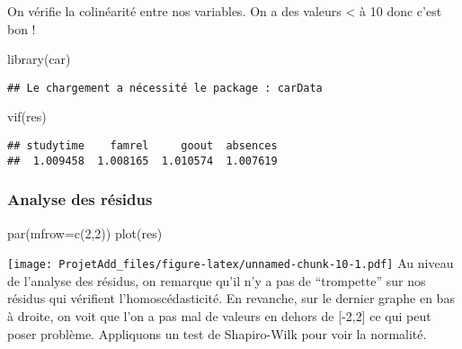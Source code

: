 \documentclass[
]{article}
\newenvironment{Shaded}{\begin{snugshade}}{\end{snugshade}}
\newcommand{\AttributeTok}[1]{\textcolor[rgb]{0.77,0.63,0.00}{#1}}
\newcommand{\DecValTok}[1]{\textcolor[rgb]{0.00,0.00,0.81}{#1}}
\newcommand{\FunctionTok}[1]{\textcolor[rgb]{0.00,0.00,0.00}{#1}}
\newcommand{\NormalTok}[1]{#1}
\newcommand{\SpecialCharTok}[1]{\textcolor[rgb]{0.00,0.00,0.00}{#1}}
\begin{document}
On vérifie la colinéarité entre nos variables. On a des valeurs
\textless{} à 10 donc c'est bon !

\begin{Shaded}
\begin{Highlighting}[]
\FunctionTok{library}\NormalTok{(car)}
\end{Highlighting}
\end{Shaded}

\begin{verbatim}
## Le chargement a nécessité le package : carData
\end{verbatim}

\begin{Shaded}
\begin{Highlighting}[]
\FunctionTok{vif}\NormalTok{(res) }
\end{Highlighting}
\end{Shaded}

\begin{verbatim}
## studytime    famrel     goout  absences 
##  1.009458  1.008165  1.010574  1.007619
\end{verbatim}

\hypertarget{analyse-des-ruxe9sidus}{%
\subsubsection{Analyse des résidus}\label{analyse-des-ruxe9sidus}}

\begin{Shaded}
\begin{Highlighting}[]
\FunctionTok{par}\NormalTok{(}\AttributeTok{mfrow=}\FunctionTok{c}\NormalTok{(}\DecValTok{2}\NormalTok{,}\DecValTok{2}\NormalTok{))}
\FunctionTok{plot}\NormalTok{(res)}
\end{Highlighting}
\end{Shaded}

\texttt{[image: ProjetAdd\_files/figure-latex/unnamed-chunk-10-1.pdf]} Au
niveau de l'analyse des résidus, on remarque qu'il n'y a pas de
``trompette'' sur nos résidus qui vérifient l'homoscédasticité. En
revanche, sur le dernier graphe en bas à droite, on voit que l'on a pas
mal de valeurs en dehors de {[}-2,2{]} ce qui peut poser problème.
Appliquons un test de Shapiro-Wilk pour voir la normalité.

\begin{Shaded}
\end{Shaded}
\end{document}
